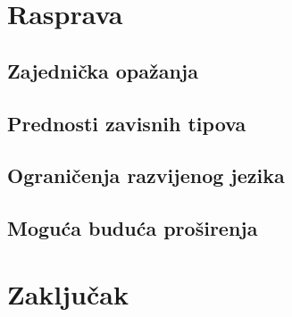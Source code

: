 \documentclass[diplomskirad,upload]{fer}
\begin{document}
%
%
%
%
%

\chapter{Rasprava}

\section{Zajednička opažanja}

\section{Prednosti zavisnih tipova}

\section{Ograničenja razvijenog jezika}

\section{Moguća buduća proširenja}

\chapter{Zaključak}
\end{document}
